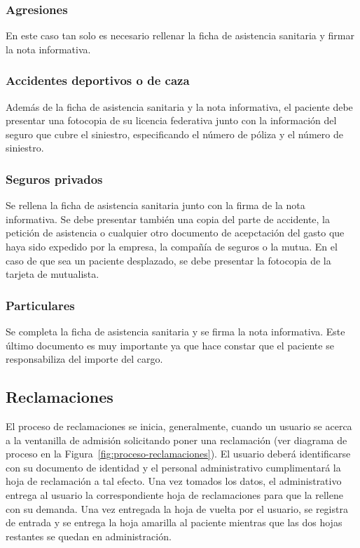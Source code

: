 \subsubsection{Agresiones}

En este caso tan solo es necesario rellenar la ficha de asistencia sanitaria y firmar la nota informativa.

\subsubsection{Accidentes deportivos o de caza}

Además de la ficha de asistencia sanitaria y la nota informativa, el paciente debe presentar una fotocopia de su licencia federativa junto con la información del seguro que cubre el siniestro, especificando el número de póliza y el número de siniestro.

\subsubsection{Seguros privados}

Se rellena la ficha de asistencia sanitaria junto con la firma de la nota informativa.
Se debe presentar también una copia del parte de accidente, la petición de asistencia o cualquier otro documento de acepctación del gasto que haya sido expedido por la empresa, la compañía de seguros o la mutua.
En el caso de que sea un paciente desplazado, se debe presentar la fotocopia de la tarjeta de mutualista.

\subsubsection{Particulares}

Se completa la ficha de asistencia sanitaria y se firma la nota informativa.
Este último documento es muy importante ya que hace constar que el paciente se responsabiliza del importe del cargo.

\subsection{Reclamaciones}

El proceso de reclamaciones se inicia, generalmente, cuando un usuario se acerca a la ventanilla de admisión solicitando poner una reclamación (ver diagrama de proceso en la Figura~\ref{fig:proceso-reclamaciones}).
El usuario deberá identificarse con su documento de identidad y el personal administrativo cumplimentará la hoja de reclamación a tal efecto.
Una vez tomados los datos, el administrativo entrega al usuario la correspondiente hoja de reclamaciones para que la rellene con su demanda.
Una vez entregada la hoja de vuelta por el usuario, se registra de entrada y se entrega la hoja amarilla al paciente mientras que las dos hojas restantes se quedan en administración.

